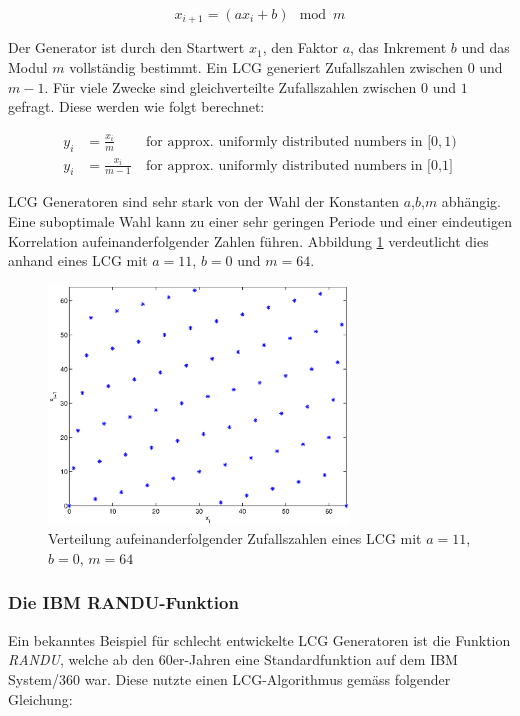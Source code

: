 \documentclass{book}
\begin{document}
\begin{refsection}
\begin{equation}
	x_{i+1} = \left( a x_{i} + b \right) \mod{m}
	\label{equ:lcg_equation}
\end{equation}

Der Generator ist durch den Startwert $x_1$, den Faktor $a$, das Inkrement $b$ und das Modul $m$ vollständig bestimmt. Ein LCG generiert Zufallszahlen zwischen $0$ und $m-1$. Für viele Zwecke sind gleichverteilte Zufallszahlen zwischen $0$ und $1$ gefragt. Diese werden wie folgt berechnet:

\begin{align}
	y_i &= \frac{x_i}{m} \: &\text{for approx. uniformly distributed numbers  in } [0,1)\\
	y_i &= \frac{x_i}{m-1} \: &\text{for approx. uniformly distributed numbers in [0,1]}
\end{align} 


LCG Generatoren sind sehr stark von der Wahl der Konstanten $a$,$b$,$m$ abhängig. Eine suboptimale Wahl kann zu einer sehr geringen Periode und einer eindeutigen Korrelation aufeinanderfolgender Zahlen führen. Abbildung \ref{fig:lcg_verteilung} verdeutlicht dies anhand eines LCG mit $a=11$, $b=0$ und $m=64$. \\

\begin{figure}[h]
	\centering
	\includegraphics[width=8cm]{images/lcg.eps}
	\caption{Verteilung aufeinanderfolgender Zufallszahlen eines LCG mit $a=11$, $b=0$, $m=64$}
	\label{fig:lcg_verteilung}
\end{figure}

\subsubsection{Die IBM RANDU-Funktion}
Ein bekanntes Beispiel für schlecht entwickelte LCG Generatoren ist die Funktion \textit{RANDU}, welche ab den 60er-Jahren eine Standardfunktion auf dem IBM System/360 war. Diese nutzte einen LCG-Algorithmus gemäss folgender Gleichung:


\end{refsection}
\end{document}
